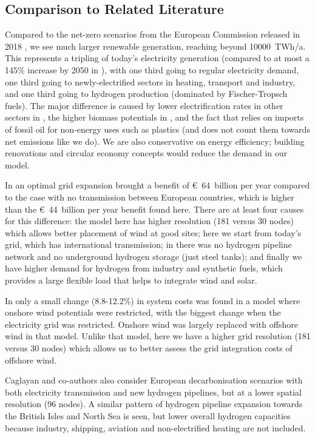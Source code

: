 \subsection*{Comparison to Related Literature}

Compared to the net-zero scenarios from the European Commission
released in 2018 \cite{in-depth_2018}, we see much larger renewable
generation, reaching beyond 10000~TWh/a. This represents a
tripling of today's electricity generation (compared to at most a
145\% increase by 2050 in \cite{in-depth_2018}), with one third going
to regular electricity demand, one third going to newly-electrified
sectors in heating, transport and industry, and one third going to
hydrogen production (dominated by Fischer-Tropsch fuels). The major
difference is caused by lower electrification rates in other sectors
in \cite{in-depth_2018}, the higher biomass potentials
in \cite{in-depth_2018}, and the fact that \cite{in-depth_2018} relies
on imports of fossil oil for non-energy uses such as plastics (and
does not count them towards net emissions like we do). We are also
conservative on energy efficiency; building renovations and
circular economy concepts would reduce the demand in our model.

In \cite{brownSynergiesSector2018} an optimal grid expansion brought a benefit
of \euro~64~billion per year compared to the case with no transmission
between European countries, which is higher than the \euro~44~billion
per year benefit found here. There are at least four causes for this
difference: the model here has higher resolution (181 versus 30 nodes)
which allows better placement of wind at good sites; here we start
from today's grid, which has international transmission;
in \cite{brownSynergiesSector2018} there was no hydrogen pipeline network and no
underground hydrogen storage (just steel tanks); and finally we have
higher demand for hydrogen from industry and synthetic fuels, which
provides a large flexible load that helps to integrate wind and solar.

In \cite{schlachtbergerCostOptimal2018} only a small change
(8.8-12.2\%) in system costs was found in a model where onshore wind potentials
were restricted, with the biggest change when the electricity grid was
restricted. Onshore wind was largely replaced with offshore wind in
that model. Unlike that model, here we have a higher grid resolution
(181 versus 30 nodes) which allows us to better assess the grid
integration costs of offshore wind.

Caglayan and co-authors \cite{Caglayan2019} also consider European
decarbonisation scenarios with both electricity transmission and new
hydrogen pipelines, but at a lower spatial resolution (96 nodes). A
similar pattern of hydrogen pipeline expansion towards the British
Isles and North Sea is seen, but lower overall hydrogen capacities
because industry, shipping, aviation and non-electrified heating are
not included.

